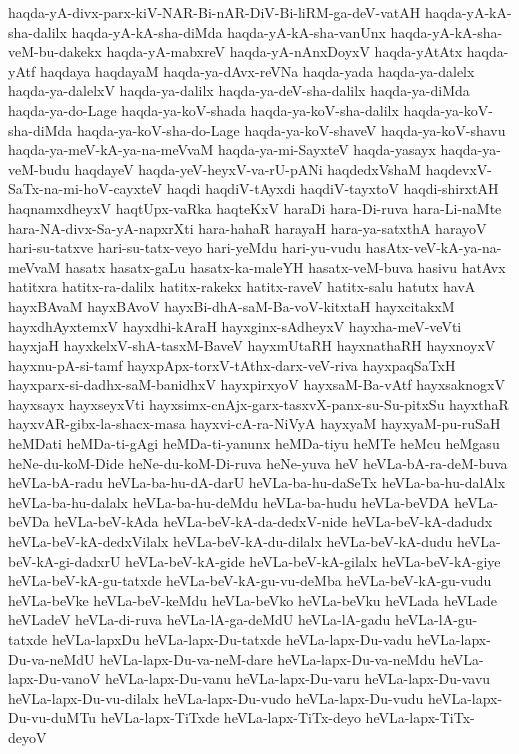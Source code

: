 {haqda-yA-divx-parx-kiV-NAR-Bi-nAR-DiV-Bi-liRM-ga-deV-vatAH
haqda-yA-kA-sha-dalilx
haqda-yA-kA-sha-diMda
haqda-yA-kA-sha-vanUnx
haqda-yA-kA-sha-veM-bu-dakekx
haqda-yA-mabxreV
haqda-yA-nAnxDoyxV
haqda-yAtAtx
haqda-yAtf
haqdaya
haqdayaM
haqda-ya-dAvx-reVNa
haqda-yada
haqda-ya-dalelx
haqda-ya-dalelxV
haqda-ya-dalilx
haqda-ya-deV-sha-dalilx
haqda-ya-diMda
haqda-ya-do-Lage
haqda-ya-koV-shada
haqda-ya-koV-sha-dalilx
haqda-ya-koV-sha-diMda
haqda-ya-koV-sha-do-Lage
haqda-ya-koV-shaveV
haqda-ya-koV-shavu
haqda-ya-meV-kA-ya-na-meVvaM
haqda-ya-mi-SayxteV
haqda-yasayx
haqda-ya-veM-budu
haqdayeV
haqda-yeV-heyxV-va-rU-pANi
haqdedxVshaM
haqdevxV-SaTx-na-mi-hoV-cayxteV
haqdi
haqdiV-tAyxdi
haqdiV-tayxtoV
haqdi-shirxtAH
haqnamxdheyxV
haqtUpx-vaRka
haqteKxV
haraDi
hara-Di-ruva
hara-Li-naMte
hara-NA-divx-Sa-yA-napxrXti
hara-hahaR
harayaH
hara-ya-satxthA
harayoV
hari-su-tatxve
hari-su-tatx-veyo
hari-yeMdu
hari-yu-vudu
hasAtx-veV-kA-ya-na-meVvaM
hasatx
hasatx-gaLu
hasatx-ka-maleYH
hasatx-veM-buva
hasivu
hatAvx
hatitxra
hatitx-ra-dalilx
hatitx-rakekx
hatitx-raveV
hatitx-salu
hatutx
havA
hayxBAvaM
hayxBAvoV
hayxBi-dhA-saM-Ba-voV-kitxtaH
hayxcitakxM
hayxdhAyxtemxV
hayxdhi-kAraH
hayxginx-sAdheyxV
hayxha-meV-veVti
hayxjaH
hayxkelxV-shA-tasxM-BaveV
hayxmUtaRH
hayxnathaRH
hayxnoyxV
hayxnu-pA-si-tamf
hayxpApx-torxV-tAthx-darx-veV-riva
hayxpaqSaTxH
hayxparx-si-dadhx-saM-banidhxV
hayxpirxyoV
hayxsaM-Ba-vAtf
hayxsaknogxV
hayxsayx
hayxseyxVti
hayxsimx-cnAjx-garx-tasxvX-panx-su-Su-pitxSu
hayxthaR
hayxvAR-gibx-la-shacx-masa
hayxvi-cA-ra-NiVyA
hayxyaM
hayxyaM-pu-ruSaH
heMDati
heMDa-ti-gAgi
heMDa-ti-yanunx
heMDa-tiyu
heMTe
heMcu
heMgasu
heNe-du-koM-Dide
heNe-du-koM-Di-ruva
heNe-yuva
heV
heVLa-bA-ra-deM-buva
heVLa-bA-radu
heVLa-ba-hu-dA-darU
heVLa-ba-hu-daSeTx
heVLa-ba-hu-dalAlx
heVLa-ba-hu-dalalx
heVLa-ba-hu-deMdu
heVLa-ba-hudu
heVLa-beVDA
heVLa-beVDa
heVLa-beV-kAda
heVLa-beV-kA-da-dedxV-nide
heVLa-beV-kA-dadudx
heVLa-beV-kA-dedxVilalx
heVLa-beV-kA-du-dilalx
heVLa-beV-kA-dudu
heVLa-beV-kA-gi-dadxrU
heVLa-beV-kA-gide
heVLa-beV-kA-gilalx
heVLa-beV-kA-giye
heVLa-beV-kA-gu-tatxde
heVLa-beV-kA-gu-vu-deMba
heVLa-beV-kA-gu-vudu
heVLa-beVke
heVLa-beV-keMdu
heVLa-beVko
heVLa-beVku
heVLada
heVLade
heVLadeV
heVLa-di-ruva
heVLa-lA-ga-deMdU
heVLa-lA-gadu
heVLa-lA-gu-tatxde
heVLa-lapxDu
heVLa-lapx-Du-tatxde
heVLa-lapx-Du-vadu
heVLa-lapx-Du-va-neMdU
heVLa-lapx-Du-va-neM-dare
heVLa-lapx-Du-va-neMdu
heVLa-lapx-Du-vanoV
heVLa-lapx-Du-vanu
heVLa-lapx-Du-varu
heVLa-lapx-Du-vavu
heVLa-lapx-Du-vu-dilalx
heVLa-lapx-Du-vudo
heVLa-lapx-Du-vudu
heVLa-lapx-Du-vu-duMTu
heVLa-lapx-TiTxde
heVLa-lapx-TiTx-deyo
heVLa-lapx-TiTx-deyoV
}

